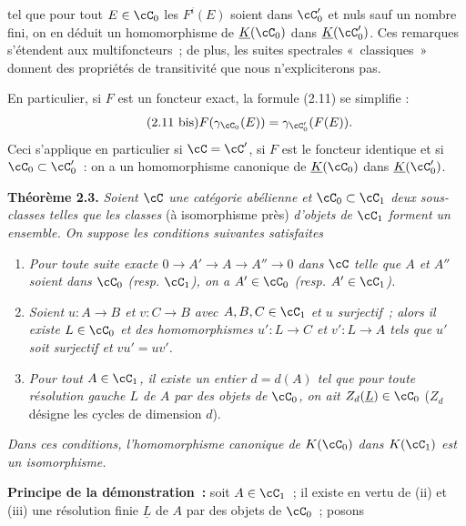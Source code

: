 tel que
pour tout $E\in\cC_0$ les $F^i(E)$ soient dans $\cC'_0$ et nuls sauf un nombre fini, on en déduit un homomorphisme de $\underline{K}(\cC_0)$ dans $\underline{K}(\cC'_0)$. Ces remarques s'étendent aux multifoncteurs~; de plus, les suites spectrales «~classiques~» donnent des propriétés de transitivité que nous n'expliciterons pas.

En particulier, si $F$ est un foncteur exact, la formule (2.11) se simplifie :
\begin{equation}\tag{2.11 bis}
 F(\gamma_{\cC_0}(E))=\gamma_{\cC'_0}(F(E)).
\end{equation}
Ceci s'applique en particulier si $\cC=\cC'$, si $F$ est le foncteur identique et si $\cC_0\subset\cC'_0$~: on a un homomorphisme canonique de $\underline{K}(\cC_0)$ dans $\underline{K}(\cC'_0)$.

\textbf{Théorème 2.3.} \emph{Soient $\cC$ une catégorie abélienne et $\cC_0\subset\cC_1$ deux sous-classes telles que les classes} (à isomorphisme près) \emph{d'objets de $\cC_1$ forment un ensemble. On suppose les conditions suivantes satisfaites}
\begin{enumerate}[label=(\roman*)]
\item \emph{Pour toute suite exacte $0\to A'\to A\to A''\to0$ dans $\cC$ telle que $A$ et $A''$ soient dans $\cC_0$ (resp. $\cC_1$), on a $A'\in\cC_0$ (resp. $A'\in\cC_1$).}
\item \emph{Soient $u:A\to B$ et $v:C\to B$ avec $A,B,C\in\cC_1$ et $u$ surjectif~; alors il existe $L\in\cC_0$ et des homomorphismes $u':L\to C$ et $v':L\to A$ tels que $u'$ soit surjectif et $vu'=uv'$.}
\item \emph{Pour tout $A\in\cC_1$, il existe un entier $d=d(A)$ tel que pour toute résolution gauche $L$ de $A$ par des objets de $\cC_0$, on ait $Z_d(\underline{L})\in\cC_0$} ($Z_d$ désigne les cycles de dimension $d$).
\end{enumerate}
\emph{Dans ces conditions, l'homomorphisme canonique de $K(\cC_0)$ dans $K(\cC_1)$ est un isomorphisme.}

\textbf{Principe de la démonstration~:} soit $A\in\cC_1$~; il existe en vertu de (ii) et (iii) une résolution finie $\underline{L}$ de $A$ par des objets de $\cC_0$~; posons
